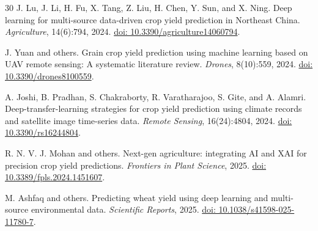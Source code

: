 \documentclass[11pt,a4paper]{article}
\begin{document}
\begin{thebibliography}{30}
J. Lu, J. Li, H. Fu, X. Tang, Z. Liu, H. Chen, Y. Sun, and X. Ning.
\newblock Deep learning for multi-source data-driven crop yield prediction in Northeast China.
\newblock \emph{Agriculture}, 14(6):794, 2024.
\newblock \href{https://doi.org/10.3390/agriculture14060794}{doi: 10.3390/agriculture14060794}.

J. Yuan and others.
\newblock Grain crop yield prediction using machine learning based on UAV remote sensing: A systematic literature review.
\newblock \emph{Drones}, 8(10):559, 2024.
\newblock \href{https://doi.org/10.3390/drones8100559}{doi: 10.3390/drones8100559}.

A. Joshi, B. Pradhan, S. Chakraborty, R. Varatharajoo, S. Gite, and A. Alamri.
\newblock Deep-transfer-learning strategies for crop yield prediction using climate records and satellite image time-series data.
\newblock \emph{Remote Sensing}, 16(24):4804, 2024.
\newblock \href{https://doi.org/10.3390/rs16244804}{doi: 10.3390/rs16244804}.

R. N. V. J. Mohan and others.
\newblock Next-gen agriculture: integrating AI and XAI for precision crop yield predictions.
\newblock \emph{Frontiers in Plant Science}, 2025.
\newblock \href{https://doi.org/10.3389/fpls.2024.1451607}{doi: 10.3389/fpls.2024.1451607}.

M. Ashfaq and others.
\newblock Predicting wheat yield using deep learning and multi-source environmental data.
\newblock \emph{Scientific Reports}, 2025.
\newblock \href{https://doi.org/10.1038/s41598-025-11780-7}{doi: 10.1038/s41598-025-11780-7}.

\end{thebibliography}
\end{document}
